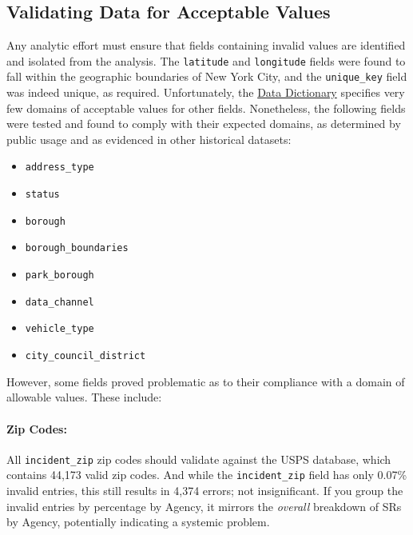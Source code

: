 \documentclass[linenumber]{jdsart}
\begin{document}
\subsection{Validating Data for Acceptable Values}
\label{sec:domain}
Any analytic effort must ensure that fields containing invalid values 
are identified and isolated from the analysis. The \texttt{latitude} 
and \texttt{longitude} fields were found to fall within the 
geographic boundaries of New York City, and 
the \texttt{unique\_key} field was indeed unique, as required. 
Unfortunately, the \href{https://data.cityofnewyork.us/api/views/erm2-nwe9/files/b372b884-f86a-453b-ba16-1fe06ce9d212?download=true&filename=311_ServiceRequest_2010-Present_DataDictionary_Updated_2023.xlsx}{Data Dictionary} specifies very few domains of 
acceptable values for other fields. Nonetheless, the following fields were tested and found to comply with their expected domains, as determined by public 
usage and as evidenced in other historical datasets:

\begin{itemize}[left=1.5em]
    \item \texttt{address\_type}
    \item \texttt{status}
    \item \texttt{borough}
    \item \texttt{borough\_boundaries}
    \item \texttt{park\_borough}
    \item \texttt{data\_channel}
    \item \texttt{vehicle\_type}
    \item \texttt{city\_council\_district}
\end{itemize}

However,  some fields proved problematic as to their 
compliance with a domain of allowable values. These include: 

\paragraph{Zip Codes:}
\label{sec:zipcodesissues}
All \texttt{incident\_zip} zip codes should 
validate against the USPS database, which contains 
44,173 valid zip codes. And while the \texttt{incident\_zip} field has 
only 0.07\% invalid entries, this still results in 4,374 errors; 
not insignificant. If you group the invalid entries by 
percentage by Agency, it mirrors the \textit{overall} 
breakdown of SRs by Agency, potentially 
indicating a systemic problem.
\end{document}
